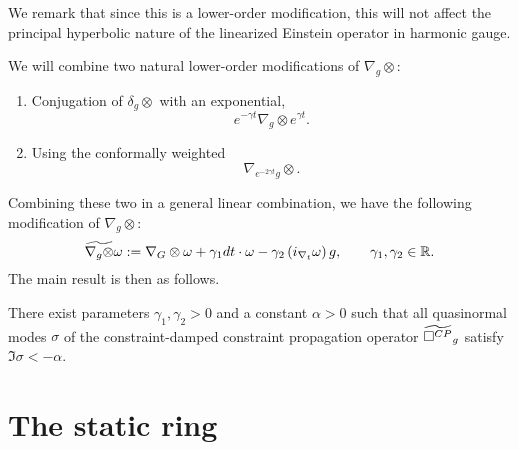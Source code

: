 \documentclass{article}
\begin{document}
We remark that since this is a lower-order modification, this will not
affect the principal hyperbolic nature of the linearized Einstein
operator in harmonic gauge.

We will combine two natural lower-order modifications of $\nabla_g\otimes$:
\begin{enumerate}
\item Conjugation of $\delta_g\otimes$ with an exponential,
  \begin{equation*}
    e^{-\gamma t}\nabla_g\otimes e^{\gamma t}.
  \end{equation*}
\item Using the conformally weighted
  \begin{equation*}
    \nabla_{e^{-2\gamma t}g}\otimes.
  \end{equation*}
\end{enumerate}
Combining these two in a general linear combination, we have the
following modification of $\nabla_g\otimes$:
\begin{equation*}
  \widetilde{\nabla_g\otimes}\omega
  := \nabla_G\otimes\omega
  + \gamma_1 dt\cdot \omega
  - \gamma_2 \left(i_{\nabla_t}\omega\right)g, \qquad
  \gamma_1,\gamma_2 \in \mathbb{R}.
\end{equation*}
The main result is then as follows.
\begin{theorem}
  There exist parameters $\gamma_1,\gamma_2>0$ and a constant
  $\alpha>0$ such that all quasinormal modes $\sigma$ of the
  constraint-damped constraint propagation operator
  $\widetilde{\Box^{CP}}_g$ satisfy
  $\Im\sigma<-\alpha$.
\end{theorem}

\section{The static ring}
\end{document}

